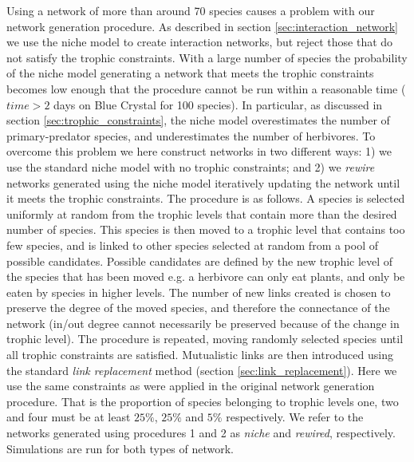 Using a network of more than around 70 species causes a problem with our network generation procedure. As described in section \ref{sec:interaction_network} we use the niche model to create interaction networks, but reject those that do not satisfy the trophic constraints. With a large number of species the probability of the niche model generating a network that meets the trophic constraints becomes low enough that the procedure cannot be run within a reasonable time ( $time>2$ days on Blue Crystal for 100 species). In particular, as discussed in section \ref{sec:trophic_constraints}, the niche model overestimates the number of primary-predator species, and underestimates the number of herbivores. To overcome this problem we here construct networks in two different ways: 1) we use the standard niche model with no trophic constraints; and 2) we \emph{rewire} networks generated using the niche model iteratively updating the network until it meets the trophic constraints. The procedure is as follows. A species is selected uniformly at random from the trophic levels that contain more than the desired number of species. This species is then moved to a trophic level that contains too few species, and is linked to other species selected at random from a pool of possible candidates. Possible candidates are defined by the new trophic level of the species that has been moved e.g. a herbivore can only eat plants, and only be eaten by species in higher levels. The number of new links created is chosen to preserve the degree of the moved species, and therefore the connectance of the network (in/out degree cannot necessarily be preserved because of the change in trophic level). The procedure is repeated, moving randomly selected species until all trophic constraints are satisfied. Mutualistic links are then introduced using the standard \emph{link replacement} method (section \ref{sec:link_replacement}). Here we use the same constraints as were applied in the original network generation procedure. That is the proportion of species belonging to trophic levels one, two and four must be at least $25\%$, $25\%$ and $5\%$ respectively. We refer to the networks generated using procedures 1 and 2 as \emph{niche} and \emph{rewired}, respectively. Simulations are run for both types of network.

